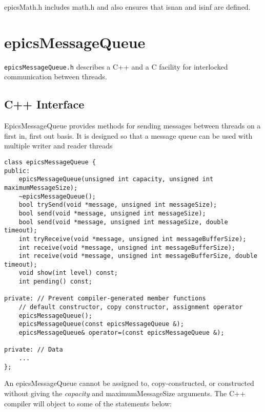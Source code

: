 epicsMath.h includes math.h and also ensures that isnan and isinf are defined.

\section{epicsMessageQueue}

\verb|epicsMessageQueue.h| describes a C++ and a C facility for interlocked communication between threads.

\subsection{C++ Interface}

EpicsMessageQueue provides methods for sending messages between threads on a first in, first out basis.  It is designed 
so that a message queue can be used with multiple writer and reader threads

\begin{verbatim}class epicsMessageQueue {
public:
    epicsMessageQueue(unsigned int capacity, unsigned int maximumMessageSize);
    ~epicsMessageQueue();
    bool trySend(void *message, unsigned int messageSize);
    bool send(void *message, unsigned int messageSize);
    bool send(void *message, unsigned int messageSize, double timeout);
    int tryReceive(void *message, unsigned int messageBufferSize);
    int receive(void *message, unsigned int messageBufferSize);
    int receive(void *message, unsigned int messageBufferSize, double timeout);
    void show(int level) const;
    int pending() const;

private: // Prevent compiler-generated member functions
    // default constructor, copy constructor, assignment operator
    epicsMessageQueue();
    epicsMessageQueue(const epicsMessageQueue &);
    epicsMessageQueue& operator=(const epicsMessageQueue &);

private: // Data
    ...
};
\end{verbatim}An epicsMessageQueue cannot be assigned to, copy-constructed, or constructed without giving the \emph{capacity} and 
maximumMessageSize arguments. The C++ compiler will object to some of the statements below:

